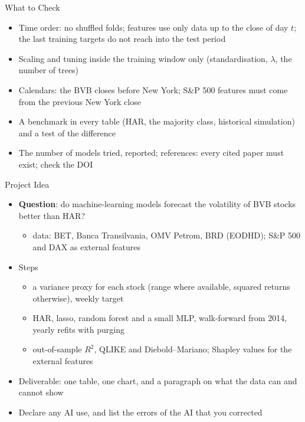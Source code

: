 \begin{frame}{What to Check}
\itemsize{\small}
\begin{itemize}
    \item Time order: no shuffled folds; features use only data up to the close of day $t$; the last training targets do not reach into the test period
    \item Scaling and tuning inside the training window only (standardisation, $\lambda$, the number of trees)
    \item Calendars: the BVB closes before New York; S\&P 500 features must come from the previous New York close
    \item A benchmark in every table (HAR, the majority class, historical simulation) and a test of the difference
    \item The number of models tried, reported; references: every cited paper must exist; check the DOI
\end{itemize}
\end{frame}

\begin{frame}{Project Idea}
\itemsize{\small}
\begin{itemize}
    \item \textbf{Question}: do machine-learning models forecast the volatility of BVB stocks better than HAR?
    \begin{itemize}
        \item data: BET, Banca Transilvania, OMV Petrom, BRD (EODHD); S\&P 500 and DAX as external features
    \end{itemize}
    \item Steps
    \begin{itemize}
        \item a variance proxy for each stock (range where available, squared returns otherwise), weekly target
        \item HAR, lasso, random forest and a small MLP, walk-forward from 2014, yearly refits with purging
        \item out-of-sample $R^2$, QLIKE and Diebold--Mariano; Shapley values for the external features
    \end{itemize}
    \item Deliverable: one table, one chart, and a paragraph on what the data can and cannot show
    \item Declare any AI use, and list the errors of the AI that you corrected
\end{itemize}
\end{frame}


